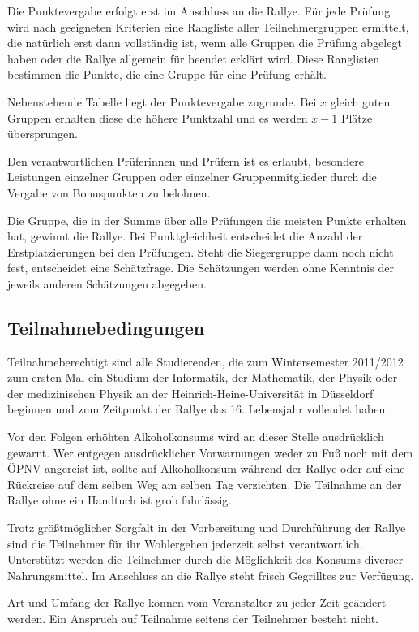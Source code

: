 \documentclass[a4paper,10pt]{article}
\begin{document}
Die Punktevergabe erfolgt erst im Anschluss an die Rallye. Für jede
Prüfung wird nach geeigneten Kriterien eine Rangliste aller
Teilnehmergruppen ermittelt, die natürlich erst dann vollständig ist,
wenn alle Gruppen die Prüfung abgelegt haben oder die Rallye allgemein
für beendet erklärt wird. Diese Ranglisten bestimmen die Punkte, die
eine Gruppe für eine Prüfung erhält.

Nebenstehende Tabelle liegt der Punktevergabe zugrunde. Bei $x$ gleich
guten Gruppen erhalten diese die höhere Punktzahl und es werden $x-1$ Plätze
übersprungen.

Den verantwortlichen Prüferinnen und Prüfern ist es erlaubt, besondere
Leistungen einzelner Gruppen oder einzelner Gruppenmitglieder durch die
Vergabe von Bonuspunkten zu belohnen.

Die Gruppe, die in der Summe über alle Prüfungen die meisten Punkte
erhalten hat, gewinnt die Rallye. Bei Punktgleichheit entscheidet die
Anzahl der Erstplatzierungen bei den Prüfungen. Steht die Siegergruppe
dann noch nicht fest, entscheidet eine Schätzfrage. Die Schätzungen
werden ohne Kenntnis der jeweils anderen Schätzungen abgegeben.

\subsection{Teilnahmebedingungen}

Teilnahmeberechtigt sind alle Studierenden, die zum Wintersemester 2011/2012 zum ersten Mal ein Studium der
Informatik, der Mathematik, der Physik oder der medizinischen Physik an
der Heinrich-Heine-Universität in Düsseldorf beginnen und zum Zeitpunkt
der Rallye das 16. Lebensjahr vollendet haben.

Vor den Folgen erhöhten Alkoholkonsums wird an dieser Stelle
ausdrücklich gewarnt. Wer entgegen ausdrücklicher Vorwarnungen weder zu
Fuß noch mit dem ÖPNV angereist ist, sollte auf Alkoholkonsum während
der Rallye oder auf eine Rückreise auf dem selben Weg am selben Tag
verzichten. Die Teilnahme an der Rallye ohne ein Handtuch ist grob
fahrlässig.

Trotz größtmöglicher Sorgfalt in der Vorbereitung und Durchführung der
Rallye sind die Teilnehmer für ihr Wohlergehen jederzeit selbst
verantwortlich. Unterstützt werden die Teilnehmer durch die Möglichkeit
des Konsums diverser Nahrungsmittel. Im Anschluss an die Rallye steht frisch Gegrilltes zur Verfügung.

Art und Umfang der Rallye können vom Veranstalter zu jeder Zeit geändert
werden. Ein Anspruch auf Teilnahme seitens der Teilnehmer besteht nicht.
\end{document}

